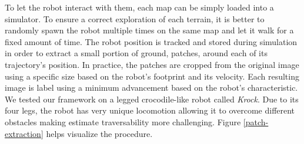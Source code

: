 \documentclass[../document.tex]{subfiles}
\begin{document}
To let the robot interact with them, each map can be simply loaded into a simulator. To ensure a correct exploration of each terrain, it is better to randomly spawn the robot multiple times on the same map and let it walk for a fixed amount of time. The robot position is tracked and stored during simulation in order to extract a small portion of ground, patches, around each of its trajectory's position. In practice, the patches are cropped from the original image using a specific size based on the robot's footprint and its velocity. Each resulting image is label using a minimum advancement based on the robot's characteristic. We tested our framework on a legged crocodile-like robot called \emph{Krock}. Due to its four legs, the robot has very unique locomotion allowing it to overcome different obstacles making estimate traversability more challenging. Figure \ref{patch-extraction} helps visualize the procedure.
\end{document}
